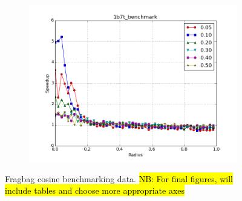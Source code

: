 \documentclass{amsbook}
\theoremstyle{definition}
\theoremstyle{remark}
\numberwithin{equation}{section}
\begin{document}
\begin{figure}[tbp]
\begin{subfigure}[b]{0.49\textwidth}
        \includegraphics[width=1\textwidth]{assets/1b7t_benchmark_cosine}
        \caption{}
    \end{subfigure}
    \caption{Fragbag cosine benchmarking data. \hl{NB: For final figures, will include tables and choose more appropriate axes}}
    \label{fig:fragbag_cosine}
\end{figure}
\end{document}
